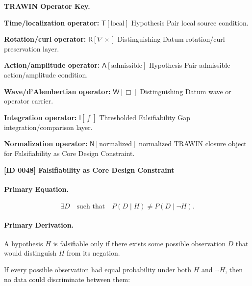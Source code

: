 \par\vspace{0.45\baselineskip}
\noindent\begin{minipage}[t]{\linewidth}
\begingroup
\small
\raggedright
\textbf{TRAWIN Operator Key.}\par
\noindent\textbf{Time/localization operator:} $\mathsf{T}\!\left[\mathrm{local}\right]$ Hypothesis Pair local source condition.\par
\noindent\textbf{Rotation/curl operator:} $\mathsf{R}\!\left[\nabla\times\right]$ Distinguishing Datum rotation/curl preservation layer.\par
\noindent\textbf{Action/amplitude operator:} $\mathsf{A}\!\left[\mathrm{admissible}\right]$ Hypothesis Pair admissible action/amplitude condition.\par
\noindent\textbf{Wave/d'Alembertian operator:} $\mathsf{W}\!\left[\Box\right]$ Distinguishing Datum wave or operator carrier.\par
\noindent\textbf{Integration operator:} $\mathsf{I}\!\left[\int\right]$ Thresholded Falsifiability Gap integration/comparison layer.\par
\noindent\textbf{Normalization operator:} $\mathsf{N}\!\left[\mathrm{normalized}\right]$ normalized TRAWIN closure object for Falsifiability as Core Design Constraint.\par
\endgroup
\end{minipage}

\clearpage
\noindent\textbf{[ID 0048] Falsifiability as Core Design Constraint}\par
\vspace{0.35em}
\paragraph{Primary Equation.}
\begin{equation}
\exists D
\quad\text{such that}\quad
P(D\mid H)\neq P(D\mid \neg H).
\end{equation}

\paragraph{Primary Derivation.}
A hypothesis $H$ is falsifiable only if there exists some possible observation $D$ that would distinguish $H$ from its negation.

If every possible observation had equal probability under both $H$ and $\neg H$, then no data could discriminate between them:

